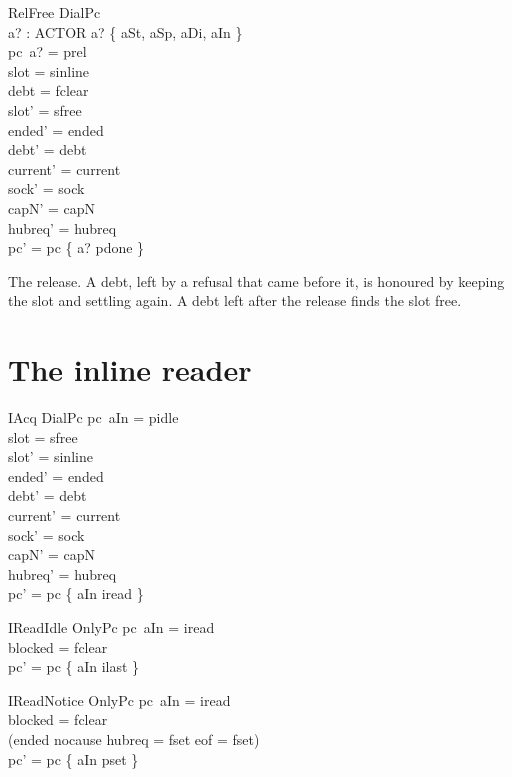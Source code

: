 \documentclass[a4paper,10pt,fleqn]{article}
\begin{document}
\begin{schema}{RelFree}
  DialPc \\
  a? : ACTOR
\where
  a? \in \{ aSt, aSp, aDi, aIn \} \\
  pc~a? = prel \\
  slot = sinline \\
  debt = fclear \\
  slot' = sfree \\
  ended' = ended \\
  debt' = debt \\
  current' = current \\
  sock' = sock \\
  capN' = capN \\
  hubreq' = hubreq \\
  pc' = pc \oplus \{ a? \mapsto pdone \}
\end{schema}

The release.  A debt, left by a refusal that came before it, is honoured by
keeping the slot and settling again.  A debt left after the release finds the
slot free.

\section{The inline reader}

\begin{schema}{IAcq}
  DialPc
\where
  pc~aIn = pidle \\
  slot = sfree \\
  slot' = sinline \\
  ended' = ended \\
  debt' = debt \\
  current' = current \\
  sock' = sock \\
  capN' = capN \\
  hubreq' = hubreq \\
  pc' = pc \oplus \{ aIn \mapsto iread \}
\end{schema}

\begin{schema}{IReadIdle}
  OnlyPc
\where
  pc~aIn = iread \\
  blocked = fclear \\
  pc' = pc \oplus \{ aIn \mapsto ilast \}
\end{schema}

\begin{schema}{IReadNotice}
  OnlyPc
\where
  pc~aIn = iread \\
  blocked = fclear \\
  (ended \neq nocause \lor hubreq = fset \lor eof = fset) \\
  pc' = pc \oplus \{ aIn \mapsto pset \}
\end{schema}
\end{document}
